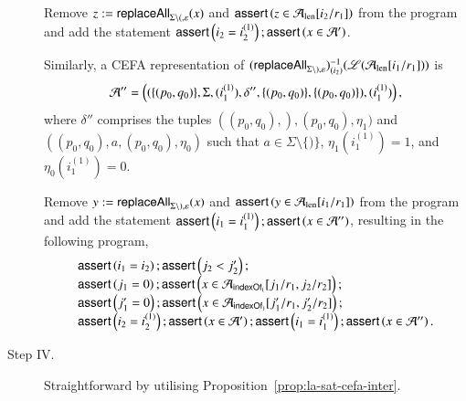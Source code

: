 \begin{example}
\begin{description}
Remove  $z:= \mathsf{replaceAll}_{\Sigma \setminus (, \varepsilon}(x)$ and $\textsf{assert}\left(z \in \mathcal{A}_{\rm len}[i_2/r_1]\right)$ from the program and add the statement $\textsf{assert}\left(i_2=i^{(1)}_2\right);\textsf{assert}\left(x \in \mathcal{A}'\right)$. 

Similarly, a CEFA representation of $(\mathsf{replaceAll}_{\Sigma \setminus ), \varepsilon})^{-1}_{(i_2)}(\mathscr{L}(\mathcal{A}_{\rm len}[i_1/r_1]))$ is  
\[\mathcal{A}'' = \left((\{(p_0, q_0)\}, \Sigma, (i^{(1)}_1), \delta'', \{(p_0, q_0)\}, \{(p_0, q_0)\}), (i^{(1)}_1)\right),\]
%
where $\delta''$ comprises the tuples $((p_0,q_0), ), (p_0,q_0), \eta_1)$ and $((p_0,q_0), a, (p_0,q_0), \eta_0)$ such that $a \in \Sigma \setminus \{)\}$, $\eta_1(i^{(1)}_1)=1$, and $\eta_0(i^{(1)}_1)=0$. 

Remove  $y:= \mathsf{replaceAll}_{\Sigma \setminus ), \varepsilon}(x)$ and $\textsf{assert}\left(y \in \mathcal{A}_{\rm len}[i_1/r_1]\right)$ from the program and add the statement $\textsf{assert}\left(i_1=i^{(1)}_1\right); \textsf{assert}\left(x \in \mathcal{A}''\right)$, resulting in the following program,
\[
\begin{array}{l}
\textsf{assert}\left(i_1 = i_2\right); \textsf{assert}\left( j_2 < j'_2\right);\\
\textsf{assert}\left(j_1 = 0\right); \textsf{assert}\left(x \in \mathcal{A}_{\mathsf{indexOf}_{(}}[j_1/r_1, j_2/r_2]\right);  \\
\textsf{assert}\left(j'_1 = 0\right); \textsf{assert}\left(x \in \mathcal{A}_{\mathsf{indexOf}_{)}}[j'_1/r_1, j'_2/r_2]\right);\\
\textsf{assert}\left(i_2=i^{(1)}_2\right); \textsf{assert}\left(x \in \mathcal{A}'\right); \textsf{assert}\left(i_1=i^{(1)}_1\right); \textsf{assert}\left(x \in \mathcal{A}''\right).
\end{array}
\] 
%
\item[Step IV.]  Straightforward by utilising Proposition~\ref{prop:la-sat-cefa-inter}. 
\end{description}

\end{example}





